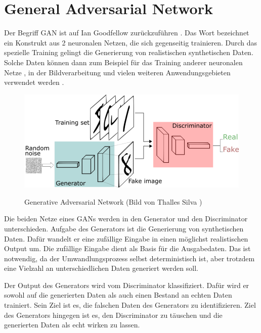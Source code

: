 
\section{General Adversarial Network}
Der Begriff \acrfull{GAN} ist auf Ian Goodfellow zurückzuführen \cite{gan-original-paper}.
Das Wort bezeichnet ein Konstrukt aus 2 neuronalen Netzen, die sich gegenseitig trainieren.
Durch das spezielle Training gelingt die Generierung von realistischen synthetischen Daten.
Solche Daten können dann zum Beispiel für das Training anderer neuronalen Netze \cite{gan-application-augmenting-training-data}, in der Bildverarbeitung \cite{gan-application-upscaling, gan-application-blending} und vielen weiteren Anwendungsgebieten verwendet werden \cite{gan-application-dna-optimizes-protein-functions, gan-application-audio-synthesis}.

\begin{figure}[H]
	\centering
	\includegraphics[width=12cm]{kapitel/2_stand_der_technik/img/GAN.png}
	\label{img:gan}
	\caption{Generative Adversarial Network (Bild von Thalles Silva \cite{img-gan})}
\end{figure}

Die beiden Netze eines \acrshort{GAN}s werden in den Generator und den Discriminator unterschieden.
Aufgabe des Generators ist die Generierung von synthetischen Daten.
Dafür wandelt er eine zufällige Eingabe in einen möglichst realistischen Output um.
Die zufällige Eingabe dient als Basis für die Ausgabedaten.
Das ist notwendig, da der Umwandlungsprozess selbst deterministisch ist, aber trotzdem eine Vielzahl an unterschiedlichen Daten generiert werden soll.
\newline

Der Output des Generators wird vom Discriminator klassifiziert.
Dafür wird er sowohl auf die generierten Daten als auch einen Bestand an echten Daten trainiert.
Sein Ziel ist es, die falschen Daten des Generators zu identifizieren.
Ziel des Generators hingegen ist es, den Discriminator zu täuschen und die generierten Daten als echt wirken zu lassen.
\newline

